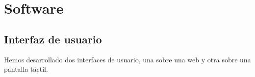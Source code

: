 \section{Software}
\subsection{Interfaz de usuario}

Hemos desarrollado dos interfaces de usuario, una sobre una web y otra sobre una pantalla táctil.











